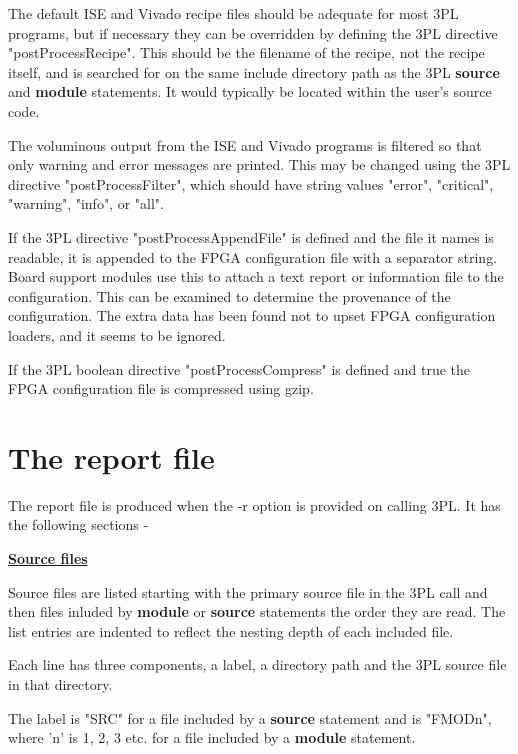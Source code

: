 	The default ISE and Vivado recipe files should be adequate for most
	3PL programs, but if necessary they can be overridden by defining the
	3PL directive "postProcessRecipe". This should be the filename of the
	recipe, not the recipe itself, and is searched for on the same
	include directory path as the 3PL {\bf source} and {\bf module}
	statements. It would typically be located within the user's source
	code.

	The voluminous output from the ISE and Vivado programs is filtered
	so that only warning and error messages are printed. This may be
	changed using the 3PL directive "postProcessFilter", which should have
	string values "error", "critical", "warning", "info", or "all".
        
	If the 3PL directive "postProcessAppendFile" is defined and the file
	it names is readable, it is appended to the FPGA configuration file
	with a separator string. Board support modules use this to attach a
	text report or information file to the configuration. This can be
	examined to determine the provenance of the configuration.
	The extra data has been found not to upset FPGA configuration loaders,
	and it seems to be ignored. 

	If the 3PL boolean directive "postProcessCompress" is defined and true
	the FPGA configuration file is compressed using gzip.

    \section{The report file}
    
        The report file is produced when the -r option is provided on calling
        3PL. It has the following sections -
        
        {\bf \underline{Source files}}
        
            Source files are listed starting with the primary source file in the
            3PL call and then files inluded by {\bf module} or {\bf source}
            statements the order they are read. The list entries are indented
            to reflect the nesting depth of each included file.
            
            Each line has three components, a label, a directory path and the
            3PL source file in that directory.
            
            The label is "SRC" for a file included by a {\bf source} statement
            and is "FMODn", where 'n' is 1, 2, 3 etc. for a file included by
            a {\bf module} statement.
            
